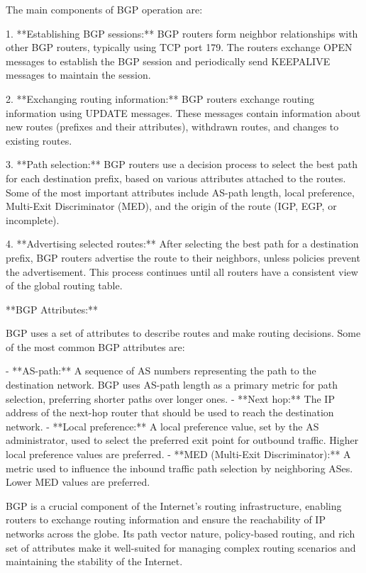 \documentclass{article}
\begin{document}
The main components of BGP operation are:

1. **Establishing BGP sessions:** BGP routers form neighbor relationships with other BGP routers, typically using TCP port 179. The routers exchange OPEN messages to establish the BGP session and periodically send KEEPALIVE messages to maintain the session.

2. **Exchanging routing information:** BGP routers exchange routing information using UPDATE messages. These messages contain information about new routes (prefixes and their attributes), withdrawn routes, and changes to existing routes.

3. **Path selection:** BGP routers use a decision process to select the best path for each destination prefix, based on various attributes attached to the routes. Some of the most important attributes include AS-path length, local preference, Multi-Exit Discriminator (MED), and the origin of the route (IGP, EGP, or incomplete).

4. **Advertising selected routes:** After selecting the best path for a destination prefix, BGP routers advertise the route to their neighbors, unless policies prevent the advertisement. This process continues until all routers have a consistent view of the global routing table.

**BGP Attributes:**

BGP uses a set of attributes to describe routes and make routing decisions. Some of the most common BGP attributes are:

- **AS-path:** A sequence of AS numbers representing the path to the destination network. BGP uses AS-path length as a primary metric for path selection, preferring shorter paths over longer ones.
- **Next hop:** The IP address of the next-hop router that should be used to reach the destination network.
- **Local preference:** A local preference value, set by the AS administrator, used to select the preferred exit point for outbound traffic. Higher local preference values are preferred.
- **MED (Multi-Exit Discriminator):** A metric used to influence the inbound traffic path selection by neighboring ASes. Lower MED values are preferred.

BGP is a crucial component of the Internet's routing infrastructure, enabling routers to exchange routing information and ensure the reachability of IP networks across the globe. Its path vector nature, policy-based routing, and rich set of attributes make it well-suited for managing complex routing scenarios and maintaining the stability of the Internet.
\end{document}
